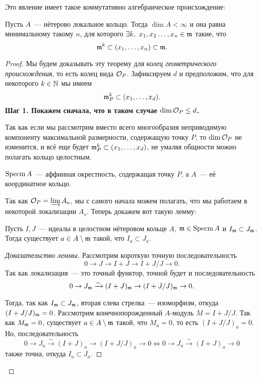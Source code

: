 	   	Это явление имеет такое коммутативно алгебраическое происхождение:    
        \begin{theorem}\label{another_def_of_dim_of_ring} 
	   		Пусть $A$~--- нётерово локальное кольцо. Тогда $\dim{A} < \infty$ и она равна минимальному такому $n$, для которого  $\exists k, \ x_1, x_2 \ldots, x_n \in \mathfrak{m}$ такие, что 
	   		\[
	   			\mathfrak{m}^k \subset (x_1, \ldots, x_n) \subset \mathfrak{m}.
	   		\]
	   	\end{theorem}
	   	\begin{proof}
	   		Мы будем доказывать эту теорему для \emph{колец геометрического происхождения}, то есть колец вида $\mathcal{O}_P$. Зафиксируем $d$ и предположим, что для некоторого $k \in \mathbb{N}$ мы имеем 
	   		\[
	   			\mathfrak{m}_P^k \subset (x_1, \ldots, x_d).
	   		\]
	   		\bf{Шаг 1.} Покажем сначала, что в таком случае $\dim{\mathcal{O}_P} \le d$. 

	   		Так как если мы рассмотрим вместо всего многообразия неприводимую компоненту максимальной размерности, содержащую точку $P$, то $\dim{\mathcal{O}_P}$ не изменится, и всё еще будет $\mathfrak{m}_P^k \subset (x_1, \ldots, x_d)$, не умаляя общности можно полагать кольцо целостным. 

	   		 $\operatorname{Specm}{A}$~--- аффинная окрестность, содержащая точку $P$, а $A$~--- её координатное кольцо. 

	 		Так как $\mathcal{O}_{P} = \varinjlim A_{a}$, мы с самого начала можем полагать, что мы работаем в некоторой локализации $A_{s}$. Теперь докажем вот такую лемму: 

	 		\begin{lemma} 
	 			Пусть $I, J$~--- идеалы в целостном нётеровом кольце $A$, $\mathfrak{m} \in \operatorname{Specm}{A}$ и $I_{\mathfrak{m}} \subset J_{\mathfrak{m}}$. Тогда существует $a \in A \setminus \mathfrak{m}$ такой, что $I_{a} \subset J_{a}$.
	 		\end{lemma}
	 		\begin{proof}[Доказательство леммы]
	 			Рассмотрим короткую точную последовательность 
	 			\[
	 				0 \to J \to I + J \to I + J/J \to 0.
	 			\]
	 			Так как локализация~--- это точный функтор, точной будет и последовательность 
	 			\[
	 				0 \to J_{\mathfrak{m}} \xrightarrow{\sim} (I + J)_{\mathfrak{m}} \to (I + J/J)_{\mathfrak{m}} \to 0.
	 			\] 

	 			Тогда, так как $I_{\mathfrak{m}} \subset J_{\mathfrak{m}}$, вторая слева стрелка~--- изоморфизм, откуда $(I + J/J)_{\mathfrak{m}} = 0$. Рассмотрим конечнопорожденный $A$-модуль $M = I + J/J$. Так как $M_{\mathfrak{m}} = 0$, существует $a \in A \setminus \mathfrak{m}$ такой, что $M_a = 0$, то есть $(I + J/J)_{a} = 0$. Но, последовательность 
	 			\[
	 				0 \to J_{a} \xrightarrow{\sim} (I + J)_{a} \to (I + J/J)_{a} \to 0 \iff 0 \to J_{a} \xrightarrow{\sim} (I + J)_{a} \to 0 
	 			\]
	 			также точна, откуда $I_a \subset J_a$.


\end{proof}
\end{proof}
